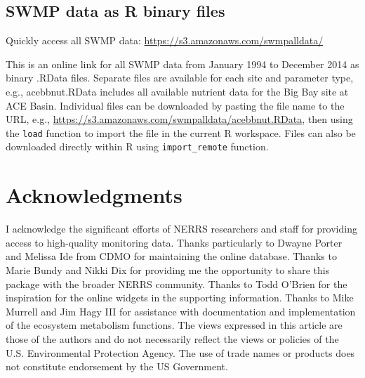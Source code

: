 \documentclass[10pt,letterpaper]{article}\usepackage[]{graphicx}\usepackage[]{color}
\begin{document}
\subsection*{\ac{SWMP} data as R binary files}

Quickly access all \ac{SWMP} data: \href{https://s3.amazonaws.com/swmpalldata/}{https://s3.amazonaws.com/swmpalldata/} 

This is an online link for all \ac{SWMP} data from January 1994 to December 2014 as binary .RData files.  Separate files are available for each site and parameter type, e.g., acebbnut.RData includes all available nutrient data for the Big Bay site at ACE Basin.  Individual files can be downloaded by pasting the file name to the URL, e.g., \href{https://s3.amazonaws.com/swmpalldata/acebbnut.RData}{https://s3.amazonaws.com/swmpalldata/acebbnut.RData}, then using the \texttt{load} function to import the file in the current R workspace.  Files can also be downloaded directly within R using \texttt{import\_remote} function.

\section*{Acknowledgments}

I acknowledge the significant efforts of \ac{NERRS} researchers and staff for providing access to high-quality monitoring data.  Thanks particularly to Dwayne Porter and Melissa Ide from \ac{CDMO} for maintaining the online database.  Thanks to Marie Bundy and Nikki Dix for providing me the opportunity to share this package with the broader \ac{NERRS} community.  Thanks to Todd O'Brien for the inspiration for the online widgets in the supporting information. Thanks to Mike Murrell and Jim Hagy III for assistance with documentation and implementation of the ecosystem metabolism functions. The views expressed in this article are those of the authors and do not necessarily reflect the views or policies of the U.S. Environmental Protection Agency.  The use of trade names or products does not constitute endorsement by the US Government.   

\nolinenumbers


\end{document}
